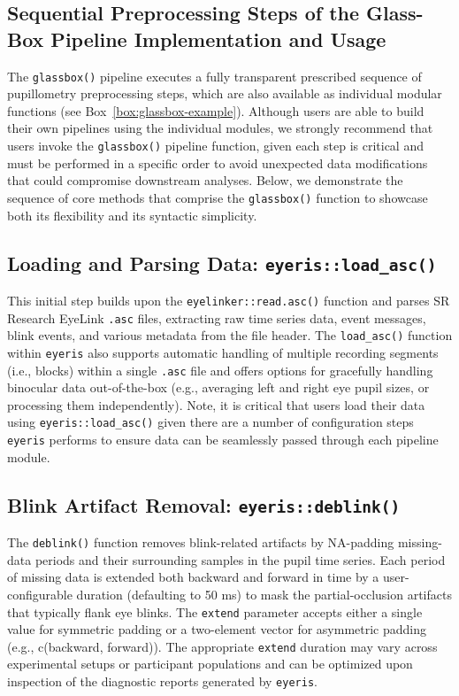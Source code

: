 \subsection{Sequential Preprocessing Steps of the Glass-Box Pipeline Implementation and Usage}
The \texttt{glassbox()} pipeline executes a fully transparent prescribed sequence of pupillometry preprocessing steps, which are also available as individual modular functions (see Box~\ref{box:glassbox-example}). Although users are able to build their own pipelines using the individual modules, we strongly recommend that users invoke the \texttt{glassbox()} pipeline function, given each step is critical and must be performed in a specific order to avoid unexpected data modifications that could compromise downstream analyses. Below, we demonstrate the sequence of core methods that comprise the \texttt{glassbox()} function to showcase both its flexibility and its syntactic simplicity.

\subsection{Loading and Parsing Data: \texttt{eyeris::load\_asc()}}
This initial step builds upon the \texttt{eyelinker::read.asc()} function and parses SR Research EyeLink \texttt{.asc} files, extracting raw time series data, event messages, blink events, and various metadata from the file header. The \texttt{load\_asc()} function within \texttt{eyeris} also supports automatic handling of multiple recording segments (i.e., blocks) within a single \texttt{.asc} file and offers options for gracefully handling binocular data out-of-the-box (e.g., averaging left and right eye pupil sizes, or processing them independently). Note, it is critical that users load their data using \texttt{eyeris::load\_asc()} given there are a number of configuration steps \texttt{eyeris} performs to ensure data can be seamlessly passed through each pipeline module.

\subsection{Blink Artifact Removal: \texttt{eyeris::deblink()}}
The \texttt{deblink()} function removes blink-related artifacts by NA-padding missing-data periods and their surrounding samples in the pupil time series. Each period of missing data is extended both backward and forward in time by a user-configurable duration (defaulting to 50 ms) to mask the partial-occlusion artifacts that typically flank eye blinks. The \texttt{extend} parameter accepts either a single value for symmetric padding or a two-element vector for asymmetric padding (e.g., c(backward, forward)). The appropriate \texttt{extend} duration may vary across experimental setups or participant populations and can be optimized upon inspection of the diagnostic reports generated by \texttt{eyeris}.

